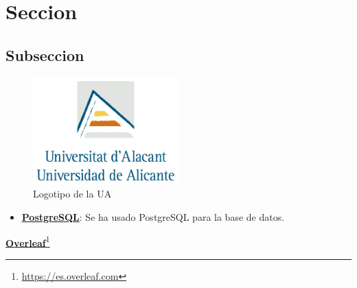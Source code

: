 \section{Seccion}
\subsection{Subseccion}

\begin{figure}[H]
        \centering
        \includegraphics[width=0.5\textwidth]{img/logotipos/logo.jpg}
        \caption{Logotipo de la UA}
        \label{fig:configApi}
\end{figure}

\begin{itemize}
    \item 
    \textcolor{blue}{\href{https://www.postgresql.org/}{\textbf{PostgreSQL}}}: Se ha usado PostgreSQL para la base de datos.
\end{itemize}



\cite{1}

\textcolor{blue}{\href{https://es.overleaf.com/}{\textbf{Overleaf}}}\footnote{\url{https://es.overleaf.com}}